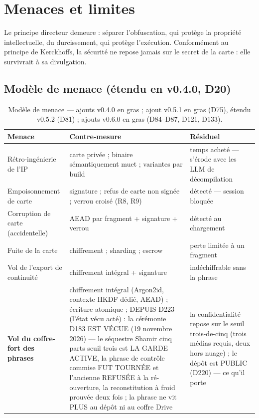\section{Menaces et limites}\label{sec:menaces}

Le principe directeur demeure : séparer l'obfuscation, qui protège la propriété
intellectuelle, du durcissement, qui protège l'exécution. Conformément au principe de
Kerckhoffs, la sécurité ne repose jamais sur le secret de la carte : elle survivrait à sa
divulgation.

\subsection{Modèle de menace (étendu en v0.4.0, D20)}

\begin{table}[htbp]
\centering\small
\caption{Modèle de menace — ajouts v0.4.0 en gras ; ajout v0.5.1 en gras (D75), étendu v0.5.2 (D81) ; ajouts v0.6.0 en gras (D84--D87, D121, D133).}
\label{tab:menaces}
\begin{tabularx}{\textwidth}{@{}Y Y Y@{}}
\toprule
\textbf{Menace} & \textbf{Contre-mesure} & \textbf{Résiduel} \\
\midrule
Rétro-ingénierie de l'IP & carte privée ; binaire sémantiquement muet ; variantes par
build & temps acheté — s'érode avec les LLM de décompilation \\
Empoisonnement de carte & signature ; refus de carte non signée ; verrou croisé (R8, R9)
& détecté — session bloquée \\
Corruption de carte (accidentelle) & AEAD par fragment + signature + verrou & détecté au
chargement \\
Fuite de la carte & chiffrement ; sharding ; escrow & perte limitée à un fragment \\
Vol de l'export de continuité & chiffrement intégral + signature & indéchiffrable sans
la phrase \\
\textbf{Vol du coffre-fort des phrases} & chiffrement intégral (Argon2id, contexte
HKDF dédié, AEAD) ; écriture atomique ; DEPUIS D223 (l'état vécu acté) : la cérémonie
D183 EST VÉCUE (19 novembre 2026) — le séquestre Shamir cinq parts seuil trois est LA
GARDE ACTIVE, la phrase de contrôle commise FUT TOURNÉE et l'ancienne REFUSÉE à la
ré-ouverture, la reconstitution à froid prouvée deux fois ; la phrase ne vit PLUS au
dépôt ni au coffre Drive & la confidentialité repose sur le seuil trois-de-cinq (trois
médias requis, deux hors nuage) ; le dépôt est PUBLIC (D220) — ce qu'il porte

\end{tabularx}
\end{table}
